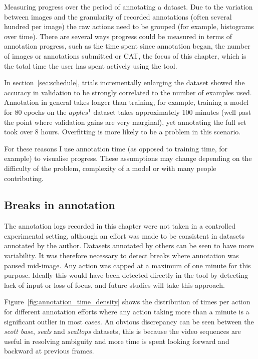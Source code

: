 Measuring progress over the period of annotating a dataset. Due to the variation between images and the granularity of recorded annotations (often several hundred per image) the raw actions need to be grouped (for example, histograms over time). There are several ways progress could be measured in terms of annotation progress, such as the time spent since annotation began, the number of images or annotations submitted or \gls{CAT}, the focus of this chapter, which is the total time the user  has spent actively using the tool.

In section~\ref{sec:schedule}, trials incrementally enlarging the dataset showed the accuracy in validation to be strongly correlated to the number of examples used. Annotation in general takes longer than training, for example, training a model for 80 epochs on the $apples^1$ dataset takes approximately 100 minutes (well past the point where validation gains are very marginal), yet annotating the full set took over 8 hours. Overfitting is more likely to be a problem in this scenario. 

For these reasons I use annotation time (as opposed to training time, for example) to visualise progress. These assumptions  may change depending on the difficulty of the problem, complexity of a model or with many people contributing.

\subsection {Breaks in annotation}
\label{sec:break_detection}

The annotation logs recorded in this chapter were not taken in a controlled experimental setting, although an effort was made to be consistent in datasets annotated by the author. Datasets annotated by others can be seen to have more variability. It was therefore necessary to detect breaks where annotation was paused mid-image. Any action was capped at a maximum of one minute for this purpose. Ideally this would have been detected directly in the tool by detecting lack of input or loss of focus, and future studies will take this approach. 

Figure~\ref{fig:annotation_time_density} shows the distribution of times per action for different annotation efforts where any action taking more than a minute is a significant outlier in most cases. An obvious discrepancy can be seen between the \emph{scott base}, \emph{seals} and \emph{scallops} datasets, this is because the video sequences are useful in resolving ambiguity and more time is spent looking forward and backward at previous frames.

